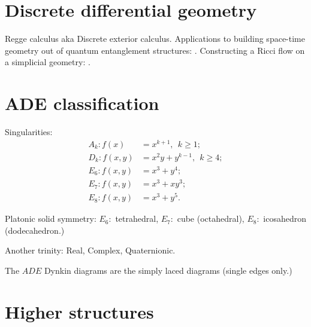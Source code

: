 \documentclass[12pt]{article}
\begin{document}
%
%

\section{Discrete differential geometry}

Regge calculus aka Discrete exterior calculus.
Applications to building space-time geometry out of
quantum entanglement structures: \cite{Cao2016}.
Constructing a Ricci flow on a simplicial geometry: \cite{Miller2014}.


%
%

\section{ADE classification}

Singularities:
\begin{align*}
A_k:f(x)   &= x^{k+1}, \ \ k\ge 1;\\
D_k:f(x,y) &= x^2y + y^{k-1},\ \  k\ge 4;\\
E_6:f(x,y) &= x^3 + y^4;\\
E_7:f(x,y) &= x^3 + xy^3;\\
E_8:f(x,y) &= x^3 + y^5.
\end{align*}

Platonic solid symmetry:
$E_6:$ tetrahedral, $E_7:$ cube (octahedral), $E_8:$ icosahedron (dodecahedron.)

Another trinity: Real, Complex, Quaternionic.

The $ADE$ Dynkin diagrams are the simply laced diagrams (single edges only.)





%
%

\section{Higher structures}
\end{document}

